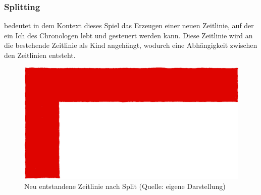\subsubsection{Splitting}\label{sec:split}
 bedeutet in dem Kontext dieses Spiel das Erzeugen einer neuen Zeitlinie, auf der ein Ich des Chronologen lebt und gesteuert werden kann. Diese Zeitlinie wird an die bestehende Zeitlinie als Kind angehängt, wodurch eine Abhängigkeit zwischen den Zeitlinien entsteht.

\begin{figure}[ht]
\centering
\includegraphics[width=0.5\linewidth]{content/pictures/Split.jpg}
\caption{Neu entstandene Zeitlinie nach Split (Quelle: eigene Darstellung)}
\label{fig:split}
\end{figure}

